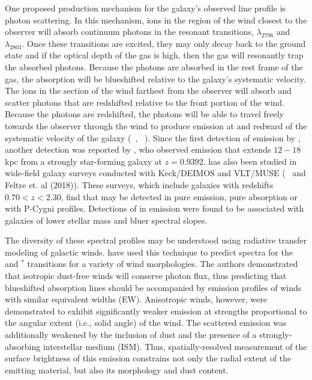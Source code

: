 \documentclass[twocolumn]{aastex61}
\newcommand{\citethnop}[1]{\citeauthor{#1}\ \citeyear{#1}}
\begin{document}
One proposed production mechanism for the galaxy's observed  line profile is photon scattering. In this mechanism,  ions in the region of the wind closest to the observer will absorb continuum photons in the resonant transitions, $\lambda_{2796}$ and $\lambda_{2803}$. Once these transitions are excited, they may only decay back to the ground state and if the optical depth of the gas is high, then the gas will resonantly trap the absorbed photons. Because the photons are absorbed in the rest frame of the gas, the absorption will be blueshifted relative to the galaxy's systematic velocity. The  ions in the section of the wind farthest from the observer will absorb and scatter photons that are redshifted relative to the front portion of the wind. Because the photons are redshifted, the photons will be able to travel freely towards the observer through the wind to produce emission at and redward of the systematic velocity of the galaxy (\citethnop{Rubin_2011}, \citethnop{Prochaska_2011}). Since the first detection of  emission by \citet{Rubin_2011}, another detection was reported by \cite{Martin2013}, who observed  emission that extends $12-18$ kpc from a strongly star-forming galaxy
at $z=0.9392$.    has also been studied in wide-field galaxy surveys conducted with Keck/DEIMOS and VLT/MUSE  (\citethnop{Erb2012} and Feltre et. al (2018)). These surveys, which include galaxies with redshifts $ 0.70 < z < 2.30$, find that  may be detected in pure emission, pure absorption or with P-Cygni profiles.  Detections of  in emission were found to be associated with galaxies of lower stellar mass and bluer spectral slopes.

The diversity of these spectral profiles may be understood using radiative transfer modeling of galactic winds.
\citet{Prochaska_2011} have used this technique to predict 
spectra for the   and  $^*$ transitions for a variety of wind morphologies.
The authors demonstrated that isotropic dust-free winds will conserve photon flux, thus predicting that blueshifted absorption lines should be accompanied by emission profiles of winds with similar equivalent widths (EW). Anisotropic winds, however, were demonstrated to exhibit significantly weaker emission at strengths proportional to the angular extent (i.e., solid angle) of the wind. The scattered emission was additionally weakened by the inclusion of dust and the presence of a strongly-absorbing interstellar medium (ISM).
Thus, spatially-resolved measurement of the surface brightness of this emission constrains not only the radial extent of the emitting material, but also its morphology and dust content.
\end{document}
